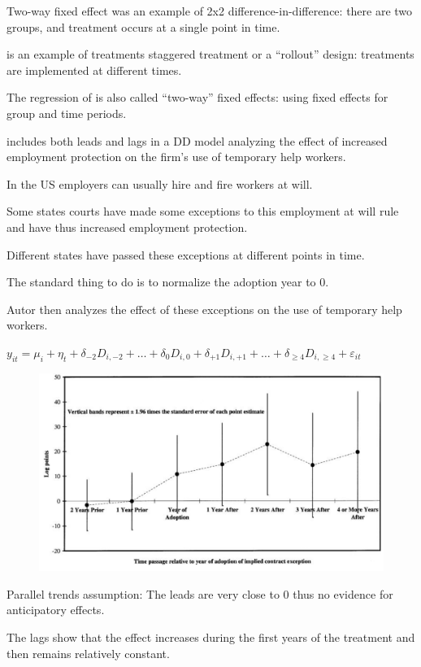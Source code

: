 \documentclass{beamer}
\begin{document}
\begin{frame}{Two-way fixed effect}
\cite{card1994minimum} was an example of 2x2 difference-in-difference: there are two groups, and treatment occurs at a single point in time.\bigskip 
	
\cite{jayaratne1996finance} is an example of treatments staggered treatment or a ``rollout'' design: treatments are implemented at different times.\bigskip 
	
	The regression of \cite{jayaratne1996finance} is also called ``two-way'' fixed effects: using fixed effects for group and time periods.\bigskip 
	
\end{frame}

\begin{frame}{\cite{autor2003outsourcing}}
	includes both leads and lags in a DD model analyzing the effect of increased employment protection on the firm's use of
	temporary help workers.\medskip
	
	In the US employers can usually hire and fire workers at will.\medskip
	
	Some states courts have made some exceptions to this employment at will rule and have thus increased employment protection.\medskip
	
	Different states have passed these exceptions at different points in time.\medskip
	
	The standard thing to do is to normalize the adoption year to 0.\medskip
	
	Autor then analyzes the effect of these exceptions on the use of temporary help workers.
\end{frame}

\begin{frame}{\cite{autor2003outsourcing}}
	$y_{it}=\mu_i+\eta_t+\delta_{-2} D_{i,-2}+\dots+\delta_{0} D_{i,0}+\delta_{+1} D_{i,+1}+\dots+\delta_{\ge4} D_{i,\ge4}+\varepsilon_{it}$
	\begin{figure}
		\centering
		\includegraphics[width=0.7\linewidth]{./Figures/autor2003}
	\end{figure}
	Parallel trends assumption: The leads are very close to 0 thus no evidence for anticipatory effects.\medskip
	
	The lags show that the effect increases during the first years of the treatment and then remains relatively constant.	
\end{frame}
\end{document}
